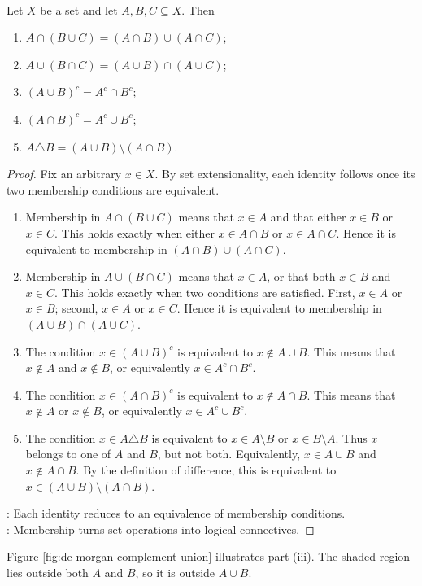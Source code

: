 \begin{proposition} \label{prop:analysis-set-algebra} \\
Let $X$ be a set and let $A,B,C\subseteq X$. Then
\begin{enumerate}[label=(\roman*)]
\setlength{\itemsep}{0pt}
\item $A\cap(B\cup C)=(A\cap B)\cup(A\cap C)$;
\item $A\cup(B\cap C)=(A\cup B)\cap(A\cup C)$;
\item $(A\cup B)^c=A^c\cap B^c$;
\item $(A\cap B)^c=A^c\cup B^c$;
\item $A\triangle B=(A\cup B)\setminus(A\cap B)$.
\end{enumerate}
\begin{proof}
Fix an arbitrary $x\in X$.
By set extensionality, each identity follows once its two membership conditions are equivalent.
\begin{enumerate}[label=(\roman*)]
\setlength{\itemsep}{0pt}
\item[(i)] Membership in $A\cap(B\cup C)$ means that $x\in A$ and that either $x\in B$ or $x\in C$.
This holds exactly when either $x\in A\cap B$ or $x\in A\cap C$.
Hence it is equivalent to membership in $(A\cap B)\cup(A\cap C)$.
\item[(ii)] Membership in $A\cup(B\cap C)$ means that $x\in A$, or that both $x\in B$ and $x\in C$.
This holds exactly when two conditions are satisfied.
First, $x\in A$ or $x\in B$; second, $x\in A$ or $x\in C$.
Hence it is equivalent to membership in $(A\cup B)\cap(A\cup C)$.
\item[(iii)] The condition $x\in(A\cup B)^c$ is equivalent to $x\notin A\cup B$.
This means that $x\notin A$ and $x\notin B$, or equivalently $x\in A^c\cap B^c$.
\item[(iv)] The condition $x\in(A\cap B)^c$ is equivalent to $x\notin A\cap B$.
This means that $x\notin A$ or $x\notin B$, or equivalently $x\in A^c\cup B^c$.
\item[(v)] The condition $x\in A\triangle B$ is equivalent to $x\in A\setminus B$ or $x\in B\setminus A$.
Thus $x$ belongs to one of $A$ and $B$, but not both.
Equivalently, $x\in A\cup B$ and $x\notin A\cap B$.
By the definition of difference, this is equivalent to $x\in(A\cup B)\setminus(A\cap B)$.
\end{enumerate}
: Each identity reduces to an equivalence of membership conditions.\\
: Membership turns set operations into logical connectives.
\end{proof}
\end{proposition}

\begin{illustrationfigure}[H]
    \centering
    
    \caption{The shaded region represents $(A\cup B)^c=A^c\cap B^c$ inside the ambient set $X$.}
    \label{fig:de-morgan-complement-union}
\end{illustrationfigure}

Figure \ref{fig:de-morgan-complement-union} illustrates part (iii).
The shaded region lies outside both $A$ and $B$, so it is outside $A\cup B$.
